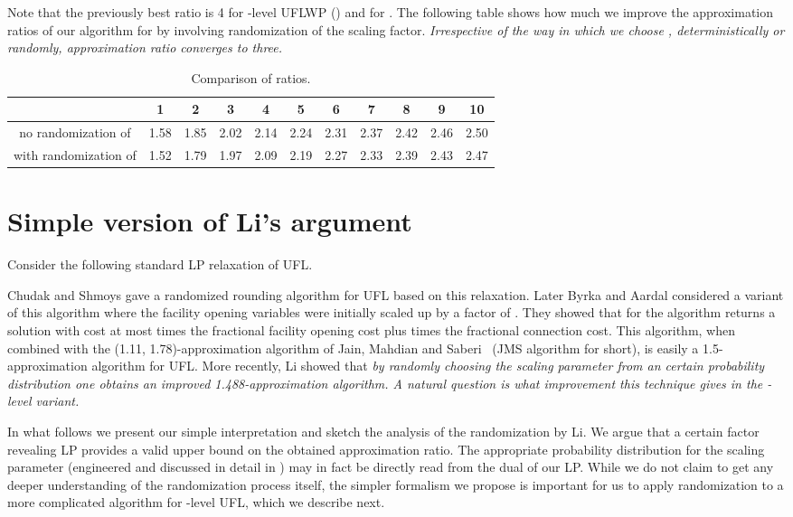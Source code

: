 \documentclass{llncs}
\newcommand{\va}[1]{{\color{black}\sl  #1}}
\begin{document}
Note that the previously best ratio is 4 for -level UFLWP () \cite{Asadi} and  for   \cite{YuLi}. The following table shows how much we improve the approximation ratios of our algorithm for  by involving randomization of the scaling factor. \va{Irrespective of the way in which we choose , deterministically or randomly, approximation ratio converges to three.}
\begin{table}
\centering
  \begin{tabular}{ c | c | c | c | c | c | c | c | c | c | c }
     & 1 & 2 & 3 & 4 & 5 & 6 & 7 & 8 & 9 & 10 \\ \hline
    no randomization of  & 1.58 & 1.85 & 2.02 & 2.14 & 2.24 & 2.31 & 2.37 & 2.42 & 2.46 & 2.50 \\ \hline
    with randomization of  & 1.52 & 1.79 & 1.97 & 2.09 & 2.19 & 2.27 &2.33 & 2.39 & 2.43 & 2.47 \\
  \end{tabular}
  \caption{Comparison of ratios.}
  \label{improved_ratios}
\end{table}

\section{Simple version of Li's argument}

Consider the following standard LP relaxation of UFL.



Chudak and Shmoys \cite{Chudak} gave a randomized rounding algorithm for UFL based on this relaxation. Later
Byrka and Aardal \cite{Byrka} considered a variant of this algorithm where the facility opening variables were initially scaled up by a factor of . They showed that
for  the algorithm returns a solution with cost at most  times the fractional facility opening cost plus  times the fractional connection cost. 
This algorithm, when combined with the (1.11, 1.78)-approximation algorithm of Jain, Mahdian and Saberi~\cite{Jain} (JMS algorithm for short), 
is easily a 1.5-approximation algorithm for UFL. More recently, Li \cite{ShiLi} showed that 
\va{by randomly choosing the scaling parameter  from an certain probability distribution one obtains an improved 1.488-approximation algorithm. 
A natural question is what improvement this technique gives in the -level variant.}

In what follows we present our simple interpretation and sketch the analysis of the randomization by Li. We argue that a certain factor revealing LP provides a valid upper bound on the obtained approximation ratio. The appropriate probability distribution for the scaling parameter (engineered and discussed in detail in \cite{ShiLi}) may in fact be directly read from the dual of our LP. While we do not claim to get any deeper understanding of the randomization process itself, the simpler formalism we propose is important for us to apply randomization to a more complicated algorithm for -level UFL, which we describe next.
\end{document}
